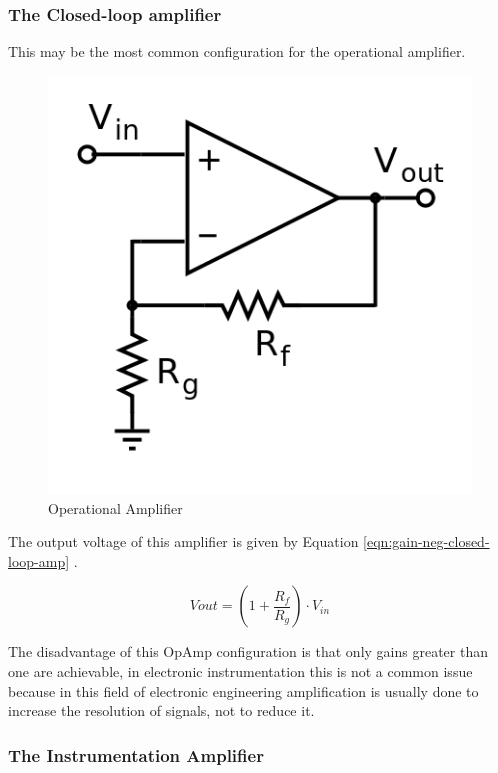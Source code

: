 	\subsubsection{The Closed-loop amplifier}\label{ssec:closed-loop-amplifier}

		This may be the most common configuration for the operational amplifier.
		
	\begin{figure}[htbp]
		\centering
			\includegraphics[scale=0.6]{figuras/fig-closed-loop-opamp.png}
		\caption{Operational Amplifier \cite{fig-closed-loop-opamp}}
		\label{fig:closed-loop-opamp}
	\end{figure}

		The output voltage of this amplifier is given by Equation \ref{eqn:gain-neg-closed-loop-amp} \cite{dorf-non-inverting-opamp-eqn}.

	\begin{equation}
		Vout =  \left( 1 + \frac{R_{f}}{R_{g}} \right) \cdot V_{in}
	\end{equation}\label{eqn-gain-neg-closed-loop-amp}

		The disadvantage of this OpAmp configuration is that only gains greater than one are achievable, in electronic instrumentation this is not a common issue because in this field of electronic engineering amplification is usually done to increase the resolution of signals, not to reduce it.

	\subsubsection{The Instrumentation Amplifier}\label{sssec:instrumentation-amplifier}

